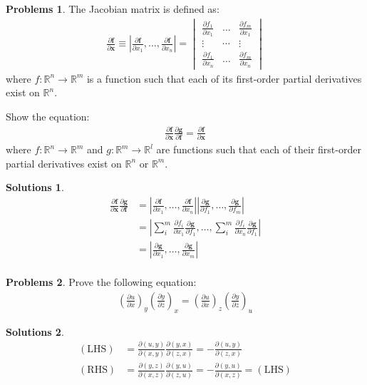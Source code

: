 \documentclass[draft]{article}
\theoremstyle{definition}
\newtheorem{problem}{Problems}[section]
\newtheorem{solution}{Solutions}[section]
\newcommand{\pardif}[2]{\frac{\partial #1}{\partial #2}}
\begin{document}
\begin{problem}
    The Jacobian matrix is defined as:
    \begin{align}
        \pardif{\bm{f}}{\bm{x}}\equiv\left|\pardif{\bm{f}}{x_1},\ldots, \pardif{\bm{f}}{x_n}\right|
        =
        \begin{vmatrix}
            \pardif{f_1}{x_1}&\ldots&\pardif{f_m}{x_1} \\
            \vdots&\cdots&\vdots \\
            \pardif{f_1}{x_n}&\ldots&\pardif{f_m}{x_n}
        \end{vmatrix}
    \end{align}
    where $f: \mathbb{R}^n \to \mathbb{R}^m$ is a function such that each of its first-order partial derivatives exist on $\mathbb{R}^n$. 
    
    Show the equation:
    \begin{align}
        \pardif{\bm{f}}{\bm{x}}\pardif{\bm{g}}{\bm{f}} = \pardif{\bm{f}}{\bm{x}}
    \end{align}
    where $f: \mathbb{R}^n \to \mathbb{R}^m$ and $g: \mathbb{R}^m \to \mathbb{R}^l$ are functions such that each of their first-order partial derivatives exist on $\mathbb{R}^n$ or $\mathbb{R}^m$. 
\end{problem}
\begin{solution}
    \begin{align}
        \pardif{\bm{f}}{\bm{x}}\pardif{\bm{g}}{\bm{f}}&=\left|\pardif{\bm{f}}{x_1},\ldots,\pardif{\bm{f}}{x_n}\right|\left|\pardif{\bm{g}}{f_1},\ldots,\pardif{\bm{g}}{f_m}\right| \\
        &=\left|\sum_i^m\pardif{f_i}{x_1}\pardif{\bm{g}}{f_1}, \ldots, \sum_i^m\pardif{f_i}{x_n}\pardif{\bm{g}}{f_1}\right| \\
        &=\left|\pardif{\bm{g}}{x_1},\ldots,\pardif{\bm{g}}{x_m}\right| \\
    \end{align}
\end{solution}

\begin{problem}
    Prove the following equation:
    \begin{align}
        \left(\pardif{u}{x}\right)_y\left(\pardif{y}{z}\right)_x=\left(\pardif{u}{x}\right)_z\left(\pardif{y}{z}\right)_u
    \end{align}    
\end{problem}
\begin{solution}
    \begin{align}
        (\mathrm{LHS}) &= \pardif{(u,y)}{(x,y)}\pardif{(y,x)}{(z,x)} = - \pardif{(u,y)}{(z,x)} \\
        (\mathrm{RHS}) &= \pardif{(y,z)}{(x,z)}\pardif{(y,u)}{(z,u)} = - \pardif{(y,u)}{(x,z)} = (\mathrm{LHS})
    \end{align}
\end{solution}
\end{document}
